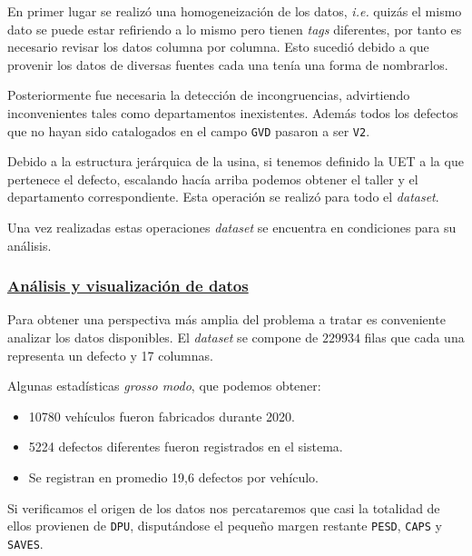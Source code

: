 \documentclass[a4paper,12pt]{article}
\begin{document}
		En primer lugar se realizó una homogeneización de los datos, \textit{i.e.} quizás el mismo dato se puede estar refiriendo a lo mismo pero tienen \textit{tags} diferentes, por tanto es necesario revisar los datos columna por columna. Esto sucedió debido a que provenir los datos de diversas fuentes cada una tenía una forma de nombrarlos. 
				
		Posteriormente fue necesaria la detección de incongruencias, advirtiendo inconvenientes tales como departamentos inexistentes. Además todos los defectos que no hayan sido catalogados en el campo \texttt{GVD} pasaron a ser \texttt{V2}.
				
		Debido a la estructura jerárquica de la usina, si tenemos definido la UET a la que pertenece el defecto, escalando hacía arriba podemos obtener el taller y el departamento correspondiente. Esta operación se realizó para todo el \textit{dataset}.
				
		Una vez realizadas estas operaciones \textit{dataset} se encuentra en condiciones para su análisis.
				
		\subsubsection{\href{https://github.com/GeraCollante/tesis-icomp-machinelearning/blob/main/DataPlottingAndAnalysis.ipynb}{\color{blue}Análisis y visualización de datos}}\label{AnalysisVisualization}
		Para obtener una perspectiva más amplia del problema a tratar es conveniente analizar los datos disponibles. El \textit{dataset} se compone de $229934$ filas que cada una representa un defecto y 17 columnas.
				
		Algunas estadísticas \textit{grosso modo}, que podemos obtener:
				
		\begin{itemize}[noitemsep, topsep=2pt]
			\item 10780 vehículos fueron fabricados durante 2020.
			\item 5224 defectos diferentes fueron registrados en el sistema.
			\item Se registran en promedio 19,6 defectos por vehículo.
		\end{itemize}
				
		Si verificamos el origen de los datos nos percataremos que casi la totalidad de ellos provienen de \texttt{DPU}, disputándose el pequeño margen restante \texttt{PESD}, \texttt{CAPS} y \texttt{SAVES}.
				
\end{document}
